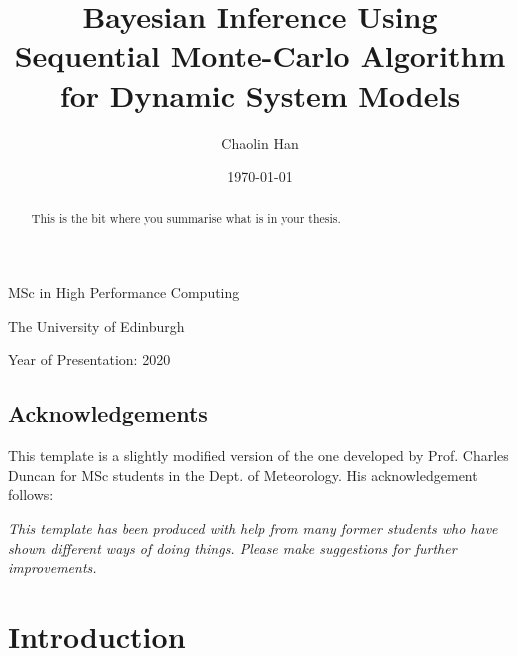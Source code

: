 \documentclass[12pt,a4paper]{report}
\begin{document}

\title{Bayesian Inference Using Sequential Monte-Carlo Algorithm for Dynamic System Models}

\author{Chaolin Han}

\date{\today}

\makeEPCCtitle

\thispagestyle{empty}

\vspace{11cm}

\begin{center}

\large{MSc in High Performance Computing}

\large{The University of Edinburgh}

\large{Year of Presentation: 2020}

\end{center}

\newpage

\begin{abstract}
This is the bit where you summarise what is in your thesis.
\end{abstract}


\tableofcontents
\listoftables
\listoffigures

\begin{titlepage}
\vspace*{2in}
\section*{Acknowledgements}

This template is a slightly modified version of the one developed by
Prof. Charles Duncan for MSc students in the Dept. of Meteorology. His
acknowledgement follows:

{\em This template has been produced with help from many former students who
have shown different ways of doing things. Please make suggestions for
further improvements.}

\end{titlepage}


\chapter{Introduction}
\end{document}
